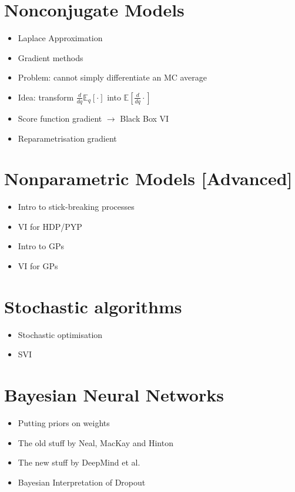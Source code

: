 \documentclass[11pt, a4paper]{article}
\begin{document}
\section{Nonconjugate Models}
\begin{itemize}
\item Laplace Approximation 
\item Gradient methods
\item Problem: cannot simply differentiate an MC average
\item Idea: transform $ \frac{d}{dq} \mathbb{E}_{q}[\cdot] $ into $ \mathbb{E}[\frac{d}{dq}\cdot] $
\item Score function gradient $ \rightarrow $ Black Box VI \citep{PaisleyEtAl:2012, RanganathEtAl:2014}
\item Reparametrisation gradient \citep{KingmaWelling:2013, RezendeEtAl:2014, TitsiasLazarogredilla:2014}
\end{itemize}

\section{Nonparametric Models [Advanced]}

\begin{itemize}
\item Intro to stick-breaking processes \citep{IshwaranJames:2001}
\item VI for HDP/PYP \citep{WangEtAl:2011}
\item Intro to GPs
\item VI for GPs
\end{itemize}

\section{Stochastic algorithms}

\begin{itemize}
	\item Stochastic optimisation \citep{RobbinsEtAl:1951}
	\item SVI \citep{HoffmanEtAl:2013}
\end{itemize}

\section{Bayesian Neural Networks}
\begin{itemize}
\item Putting priors on weights
\item The old stuff by Neal, MacKay and Hinton \citep{HintonVancamp:1993}
\item The new stuff by DeepMind et al. \citep{Graves:2011, BlundellEtAl:2015}
\item Bayesian Interpretation of Dropout \citep{Gal:2016}
\end{itemize}
\end{document}
